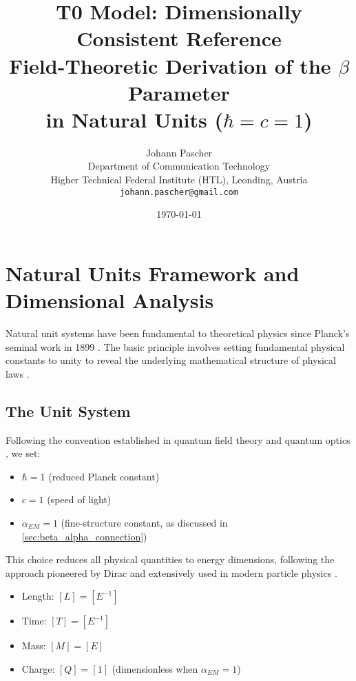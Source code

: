 \documentclass[12pt,a4paper]{article}
\begin{document}
	
	\title{T0 Model: Dimensionally Consistent Reference \\
		Field-Theoretic Derivation of the $\beta$ Parameter \\
		in Natural Units ($\hbar = c = 1$)}
	\author{Johann Pascher\\
		Department of Communication Technology\\
		Higher Technical Federal Institute (HTL), Leonding, Austria\\
		\texttt{johann.pascher@gmail.com}}
	\date{\today}
	
	\maketitle
	\tableofcontents
	\newpage
	
	\section{Natural Units Framework and Dimensional Analysis}
	\label{sec:natural_units}
	
	Natural unit systems have been fundamental to theoretical physics since Planck's seminal work in 1899 \citep{planck1900,planck1906}. The basic principle involves setting fundamental physical constants to unity to reveal the underlying mathematical structure of physical laws \citep{weinberg1995,peskin1995}.
	
	\subsection{The Unit System}
	\label{subsec:unit_system}
	
	Following the convention established in quantum field theory \citep{peskin1995,weinberg1995} and quantum optics \citep{scully1997}, we set:
	\begin{itemize}
		\item $\hbar = 1$ (reduced Planck constant)
		\item $c = 1$ (speed of light)
		\item $\alpha_{EM} = 1$ (fine-structure constant, as discussed in \cref{sec:beta_alpha_connection})
	\end{itemize}
	
	This choice reduces all physical quantities to energy dimensions, following the approach pioneered by Dirac \citep{dirac1958} and extensively used in modern particle physics \citep{griffiths2008}.
	
	\begin{tcolorbox}[colback=blue!5!white,colframe=blue!75!black,title=Dimensions in Natural Units \citep{weinberg1995}]
		\begin{itemize}
			\item Length: $[L] = [E^{-1}]$
			\item Time: $[T] = [E^{-1}]$ 
			\item Mass: $[M] = [E]$
			\item Charge: $[Q] = [1]$ (dimensionless when $\alpha_{EM} = 1$)
		\end{itemize}
	\end{tcolorbox}
	
\end{document}
